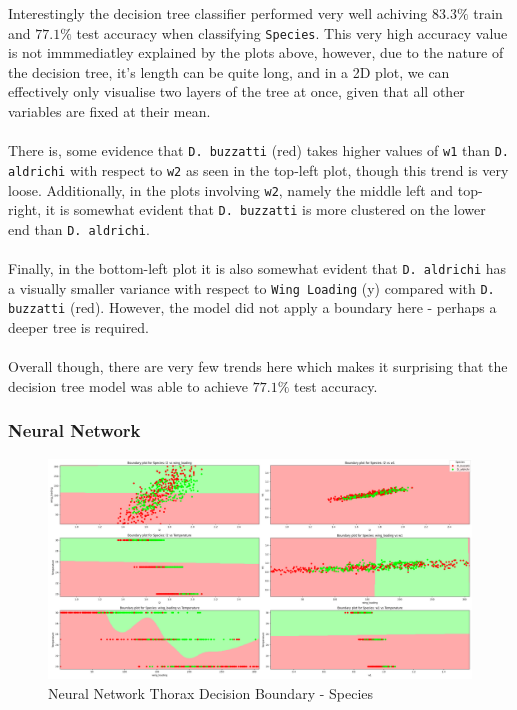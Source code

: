 \documentclass{article}
\begin{document}
Interestingly the decision tree classifier performed very well achiving $83.3\%$ train and $77.1\%$ test accuracy when classifying \texttt{Species}. This very high accuracy value is not immmediatley explained by the plots above, however, due to the nature of the decision tree, it's length can be quite long, and in a 2D plot, we can effectively only visualise two layers of the tree at once, given that all other variables are fixed at their mean. \\
\\
There is, some evidence that \texttt{D. buzzatti} (red) takes higher values of \texttt{w1} than \texttt{D. aldrichi} with respect to \texttt{w2} as seen in the top-left plot, though this trend is very loose. Additionally, in the plots involving \texttt{w2}, namely the middle left and top-right, it is somewhat evident that \texttt{D. buzzatti} is more clustered on the lower end than \texttt{D. aldrichi}. \\
\\
Finally, in the bottom-left plot it is also somewhat evident that \texttt{D. aldrichi} has a visually smaller variance with respect to \texttt{Wing Loading} (y) compared with \texttt{D. buzzatti} (red). However, the model did not apply a boundary here - perhaps a deeper tree is required. \\
\\
Overall though, there are very few trends here which makes it surprising that the decision tree model was able to achieve $77.1\%$ test accuracy.

\newpage
\subsubsection{Neural Network}

\begin{figure}[htb]
    \centering
    \includegraphics[width=0.8\columnwidth]{plots/nn_Thorax_decision_boundaries_Species.png}
    \caption{Neural Network Thorax Decision Boundary - Species}
    \label{fig:nn_thorax_db_species}
\end{figure}
\end{document}
